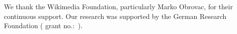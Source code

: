 \begin{acks}
  We thank the Wikimedia Foundation, particularly Marko Obrovac, for their continuous support. Our research was supported by the German Research Foundation ( grant no.:~).
\end{acks}
